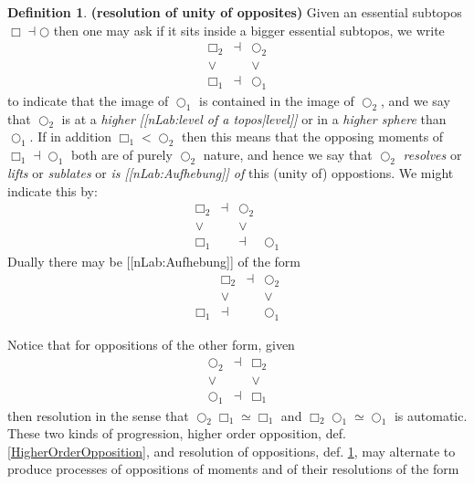 \documentclass[12pt,titlepage]{article}
\newcommand{\itexarray}[1]{\begin{matrix}#1\end{matrix}}
\newcommand{\lt}{<}
\theoremstyle{plain}
\theoremstyle{definition}
\newtheorem{defn}{Definition}
\theoremstyle{remark}
\begin{document}
\begin{defn}
\label{ResolutionOfOpposition}\hypertarget{ResolutionOfOpposition}{}
\textbf{(resolution of unity of opposites)}
Given an essential subtopos $\Box \dashv \bigcirc$ then one may ask if it sits inside a bigger essential subtopos, we write
\begin{displaymath}
\itexarray{
     \Box_2 &\dashv& \bigcirc_2
     \\
     \vee && \vee
     \\
     \Box_1 &\dashv& \bigcirc_1
  }
\end{displaymath}
to indicate that the image of $\bigcirc_1$ is contained in the image of $\bigcirc_2$, and we say that $\bigcirc_2$ is at a \emph{higher [[nLab:level of a topos|level]]} or in a \emph{higher sphere} than $\bigcirc_1$.
If in addition $\Box_1 \lt \bigcirc_2$ then this means that the opposing moments of $\Box_1 \dashv \bigcirc_1$ both are of purely $\bigcirc_2$ nature, and hence we say that $\bigcirc_2$ \emph{resolves} or \emph{lifts} or \emph{sublates} or \emph{is [[nLab:Aufhebung]] of} this (unity of) oppostions. We might indicate this by:
\begin{displaymath}
\itexarray{
     \Box_2 &\dashv& \bigcirc_2
     \\
     \vee && \vee
     \\
     \Box_1 & &\dashv& \bigcirc_1
  }
\end{displaymath}
Dually there may be [[nLab:Aufhebung]] of the form
\begin{displaymath}
\itexarray{
     & \Box_2 &\dashv& \bigcirc_2
     \\
     & \vee && \vee
     \\
     \Box_1 &\dashv& & \bigcirc_1
  }
\end{displaymath}
\end{defn}
Notice that for oppositions of the other form, given
\begin{displaymath}
\itexarray{
     \bigcirc_2 &\dashv& \Box_2
     \\
     \vee && \vee
     \\
     \bigcirc_1 &\dashv& \Box_1
  }
\end{displaymath}
then resolution in the sense that $\bigcirc_2 \Box _1 \simeq \Box_1$ and $\Box_2 \bigcirc_1 \simeq \bigcirc_1$ is automatic.
These two kinds of progression, higher order opposition, def. \ref{HigherOrderOpposition}, and resolution of oppositions, def. \ref{ResolutionOfOpposition}, may alternate to produce processes of oppositions of moments and of their resolutions of the form
\end{document}

